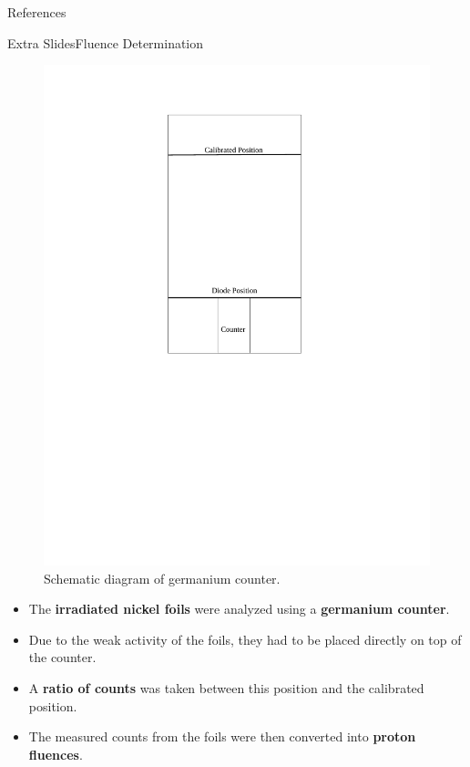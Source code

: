 \documentclass{beamer}
\begin{document}
\begin{frame}[allowframebreaks]{References}
    \printbibliography[heading=none]
\end{frame}

\begin{frame}{Extra Slides}{Fluence Determination}
        \begin{minipage}{0.45\linewidth}
            \begin{figure}
                \centering
                \includegraphics[width = 0.9\linewidth, trim = {6.5cm 11.5cm 5.5cm 2cm}, clip = true]{Counter.pdf}
                \caption{\footnotesize Schematic diagram of germanium counter.}
            \end{figure}
        \end{minipage}%
        \begin{minipage}{0.55\linewidth}
            \begin{itemize}
                \item The \textbf{irradiated nickel foils} were analyzed using a \textbf{germanium counter}.
                \item Due to the weak activity of the foils, they had to be placed directly on top of the counter.
                \item A \textbf{ratio of counts} was taken between this position and the calibrated position.
                \item The measured counts from the foils were then converted into \textbf{proton fluences}.
            \end{itemize}
        \end{minipage}%
\end{frame}
\end{document}
